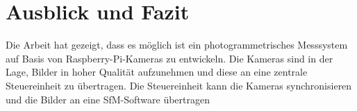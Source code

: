 \documentclass[./00PhotoBox.tex]{subfiles}
\begin{document}
\chapter{Ausblick und Fazit}

Die Arbeit hat gezeigt, dass es möglich ist ein photogrammetrisches Messsystem auf Basis von Raspberry-Pi-Kameras zu entwickeln. Die Kameras sind in der Lage, Bilder in hoher Qualität aufzunehmen und diese an eine zentrale Steuereinheit zu übertragen. Die Steuereinheit kann die Kameras synchronisieren und die Bilder an eine \gls{SfM}-Software übertragen




\biblio
\end{document}
